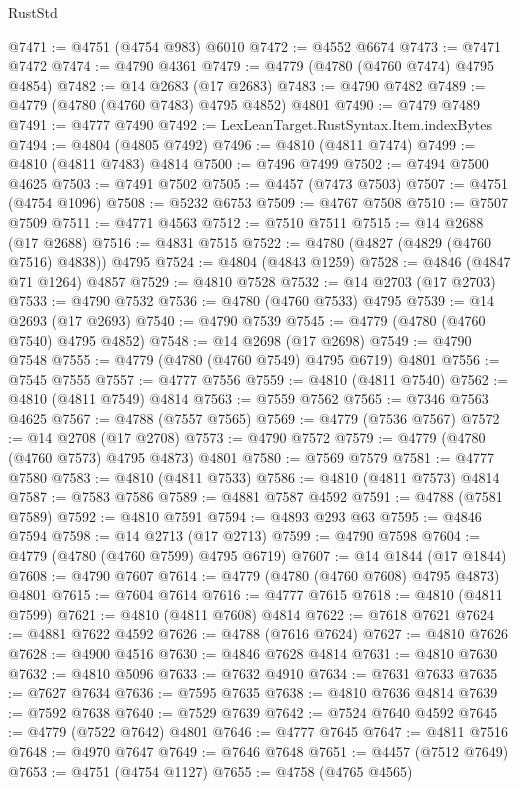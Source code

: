 \begin{lexlean}{RustStd}
\begin{coremodule}
@7471 := @4751 (@4754 @983) @6010
@7472 := @4552 @6674
@7473 := @7471 @7472
@7474 := @4790 @4361
@7479 := @4779 (@4780 (@4760 @7474) @4795 @4854)
@7482 := @14 @2683 (@17 @2683)
@7483 := @4790 @7482
@7489 := @4779 (@4780 (@4760 @7483) @4795 @4852) @4801
@7490 := @7479 @7489
@7491 := @4777 @7490
@7492 := LexLeanTarget.RustSyntax.Item.indexBytes
@7494 := @4804 (@4805 @7492)
@7496 := @4810 (@4811 @7474)
@7499 := @4810 (@4811 @7483) @4814
@7500 := @7496 @7499
@7502 := @7494 @7500 @4625
@7503 := @7491 @7502
@7505 := @4457 (@7473 @7503)
@7507 := @4751 (@4754 @1096)
@7508 := @5232 @6753
@7509 := @4767 @7508
@7510 := @7507 @7509
@7511 := @4771 @4563
@7512 := @7510 @7511
@7515 := @14 @2688 (@17 @2688)
@7516 := @4831 @7515
@7522 := @4780 (@4827 (@4829 (@4760 @7516) @4838)) @4795
@7524 := @4804 (@4843 @1259)
@7528 := @4846 (@4847 @71 @1264) @4857
@7529 := @4810 @7528
@7532 := @14 @2703 (@17 @2703)
@7533 := @4790 @7532
@7536 := @4780 (@4760 @7533) @4795
@7539 := @14 @2693 (@17 @2693)
@7540 := @4790 @7539
@7545 := @4779 (@4780 (@4760 @7540) @4795 @4852)
@7548 := @14 @2698 (@17 @2698)
@7549 := @4790 @7548
@7555 := @4779 (@4780 (@4760 @7549) @4795 @6719) @4801
@7556 := @7545 @7555
@7557 := @4777 @7556
@7559 := @4810 (@4811 @7540)
@7562 := @4810 (@4811 @7549) @4814
@7563 := @7559 @7562
@7565 := @7346 @7563 @4625
@7567 := @4788 (@7557 @7565)
@7569 := @4779 (@7536 @7567)
@7572 := @14 @2708 (@17 @2708)
@7573 := @4790 @7572
@7579 := @4779 (@4780 (@4760 @7573) @4795 @4873) @4801
@7580 := @7569 @7579
@7581 := @4777 @7580
@7583 := @4810 (@4811 @7533)
@7586 := @4810 (@4811 @7573) @4814
@7587 := @7583 @7586
@7589 := @4881 @7587 @4592
@7591 := @4788 (@7581 @7589)
@7592 := @4810 @7591
@7594 := @4893 @293 @63
@7595 := @4846 @7594
@7598 := @14 @2713 (@17 @2713)
@7599 := @4790 @7598
@7604 := @4779 (@4780 (@4760 @7599) @4795 @6719)
@7607 := @14 @1844 (@17 @1844)
@7608 := @4790 @7607
@7614 := @4779 (@4780 (@4760 @7608) @4795 @4873) @4801
@7615 := @7604 @7614
@7616 := @4777 @7615
@7618 := @4810 (@4811 @7599)
@7621 := @4810 (@4811 @7608) @4814
@7622 := @7618 @7621
@7624 := @4881 @7622 @4592
@7626 := @4788 (@7616 @7624)
@7627 := @4810 @7626
@7628 := @4900 @4516
@7630 := @4846 @7628 @4814
@7631 := @4810 @7630
@7632 := @4810 @5096
@7633 := @7632 @4910
@7634 := @7631 @7633
@7635 := @7627 @7634
@7636 := @7595 @7635
@7638 := @4810 @7636 @4814
@7639 := @7592 @7638
@7640 := @7529 @7639
@7642 := @7524 @7640 @4592
@7645 := @4779 (@7522 @7642) @4801
@7646 := @4777 @7645
@7647 := @4811 @7516
@7648 := @4970 @7647
@7649 := @7646 @7648
@7651 := @4457 (@7512 @7649)
@7653 := @4751 (@4754 @1127)
@7655 := @4758 (@4765 @4565)

\end{coremodule}
\end{lexlean}
